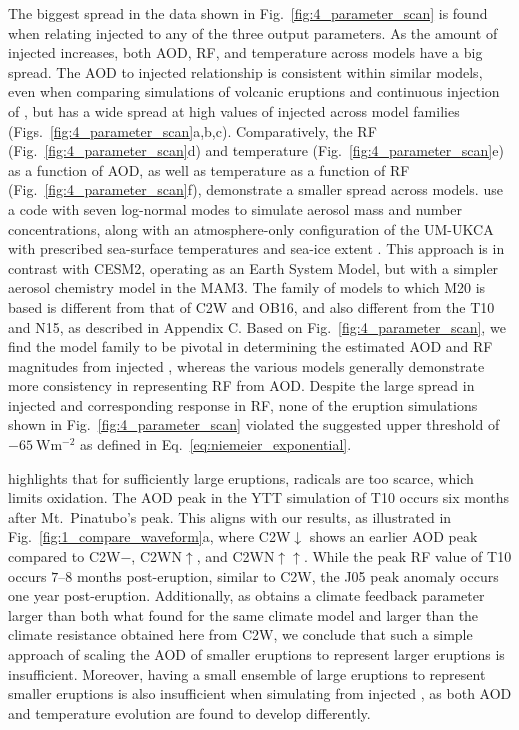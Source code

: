 \documentclass[draft]{agujournal2019}
\newcommand{\iso}[1][i]{{#1}njected \ce{SO2}}
\newcommand{\cw}{C2W}
\newcommand{\cwm}{C2W\(\downarrow\)}
\newcommand{\cwmp}{C2W\(-\)}
\newcommand{\cws}{C2WN\(\uparrow\)}
\newcommand{\cwss}{C2WN\(\uparrow\uparrow\)}
\begin{document}
The biggest spread in the data shown in Fig.~\ref{fig:4_parameter_scan} is found when
relating \iso{} to any of the three output parameters. As the amount of \iso{}
increases, both AOD, RF, and temperature across models have a big spread. The AOD to
\iso{} relationship is consistent within similar models, even when comparing simulations
of volcanic eruptions \cite{timmreck2010} and continuous injection of 
\cite{niemeier2015}, but has a wide spread at high values of \iso{} across model
families (Figs.~\ref{fig:4_parameter_scan}a,b,c). Comparatively, the RF
(Fig.~\ref{fig:4_parameter_scan}d) and temperature (Fig.~\ref{fig:4_parameter_scan}e) as
a function of AOD, as well as temperature as a function of RF
(Fig.~\ref{fig:4_parameter_scan}f), demonstrate a smaller spread across models.
 use a code with seven log-normal modes
to simulate aerosol mass and number concentrations, along with an atmosphere-only
configuration of the UM-UKCA with prescribed sea-surface temperatures and sea-ice extent
\cite{marshall2019}. This approach is in contrast with CESM2, operating as an Earth
System Model, but with a simpler aerosol chemistry model in the MAM3. The family of
models to which M20 is based is different from that of \cw{} and OB16, and also
different from the T10 and N15, as described in Appendix C. Based on
Fig.~\ref{fig:4_parameter_scan}, we find the model family to be pivotal in determining
the estimated AOD and RF magnitudes from \iso{}, whereas the various models generally
demonstrate more consistency in representing RF from AOD. Despite the large spread in
\iso{} and corresponding response in RF, none of the eruption simulations shown in
Fig.~\ref{fig:4_parameter_scan} violated the suggested upper threshold of
\(\SI{-65}{\watt\metre^{-2}}\) as defined in Eq.~\ref{eq:niemeier_exponential}.

 highlights that for sufficiently large eruptions,  radicals
are too scarce, which limits  oxidation. The AOD peak in the YTT simulation of
T10 occurs six months after Mt.\ Pinatubo's peak. This aligns with our results, as
illustrated in Fig.~\ref{fig:1_compare_waveform}a, where \cwm{} shows an earlier AOD
peak compared to \cwmp{}, \cws{}, and \cwss{}. While the peak RF value of T10 occurs
\(7\)--\(8\) months post-eruption, similar to \cw{}, the J05 peak anomaly occurs one
year post-eruption. Additionally, as  obtains a climate feedback
parameter larger than both what  found for the same climate model and
larger than the climate resistance obtained here from \cw{}, we conclude that such a
simple approach of scaling the AOD of smaller eruptions to represent larger eruptions is
insufficient. Moreover, having a small ensemble of large eruptions to represent smaller
eruptions is also insufficient when simulating from \iso{}, as both AOD and temperature
evolution are found to develop differently.
\end{document}
